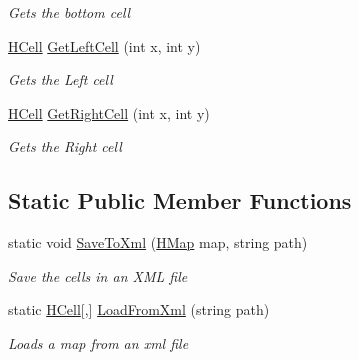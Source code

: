 \begin{DoxyCompactItemize}
\begin{DoxyCompactList}\small\item\em Gets the bottom cell \end{DoxyCompactList}\item 
\hyperlink{class_hel_project_1_1_game_world_1_1_map_1_1_h_cell}{H\+Cell} \hyperlink{class_hel_project_1_1_game_world_1_1_map_1_1_h_map_ae35fa29d0071ce316675883d42818024}{Get\+Left\+Cell} (int x, int y)
\begin{DoxyCompactList}\small\item\em Gets the Left cell \end{DoxyCompactList}\item 
\hyperlink{class_hel_project_1_1_game_world_1_1_map_1_1_h_cell}{H\+Cell} \hyperlink{class_hel_project_1_1_game_world_1_1_map_1_1_h_map_a6f599e28b7a3133e6857e61534b44e34}{Get\+Right\+Cell} (int x, int y)
\begin{DoxyCompactList}\small\item\em Gets the Right cell \end{DoxyCompactList}\end{DoxyCompactItemize}
\subsection*{Static Public Member Functions}
\begin{DoxyCompactItemize}
\item 
static void \hyperlink{class_hel_project_1_1_game_world_1_1_map_1_1_h_map_a014aa4c548e54e2aba3fa8cec42fcb56}{Save\+To\+Xml} (\hyperlink{class_hel_project_1_1_game_world_1_1_map_1_1_h_map}{H\+Map} map, string path)
\begin{DoxyCompactList}\small\item\em Save the cells in an X\+M\+L file \end{DoxyCompactList}\item 
static \hyperlink{class_hel_project_1_1_game_world_1_1_map_1_1_h_cell}{H\+Cell}\mbox{[},\mbox{]} \hyperlink{class_hel_project_1_1_game_world_1_1_map_1_1_h_map_ae8b095cbbd47a2dbf88b8380f5765a78}{Load\+From\+Xml} (string path)
\begin{DoxyCompactList}\small\item\em Loads a map from an xml file \end{DoxyCompactList}\end{DoxyCompactItemize}
